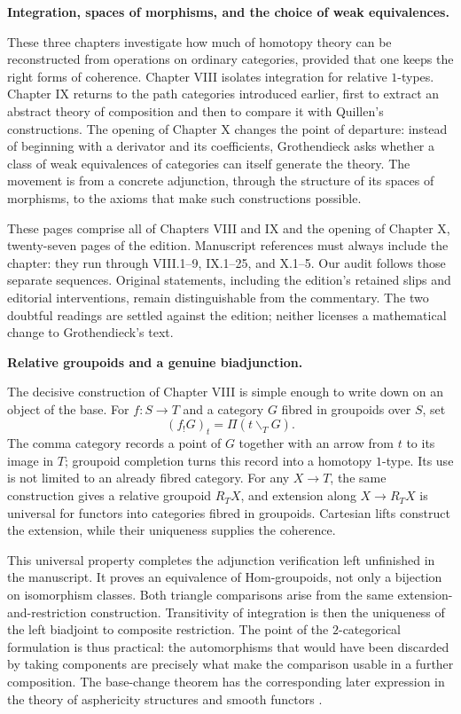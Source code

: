 \noindent\textbf{Integration, spaces of morphisms, and the choice of weak equivalences.}

These three chapters investigate how much of homotopy theory can be reconstructed from operations on ordinary categories, provided that one keeps the right forms of coherence. Chapter VIII isolates integration for relative $1$-types. Chapter IX returns to the path categories introduced earlier, first to extract an abstract theory of composition and then to compare it with Quillen's constructions. The opening of Chapter X changes the point of departure: instead of beginning with a derivator and its coefficients, Grothendieck asks whether a class of weak equivalences of categories can itself generate the theory. The movement is from a concrete adjunction, through the structure of its spaces of morphisms, to the axioms that make such constructions possible.

These pages comprise all of Chapters VIII and IX and the opening of Chapter X, twenty-seven pages of the edition. Manuscript references must always include the chapter: they run through VIII.1--9, IX.1--25, and X.1--5. Our audit follows those separate sequences. Original statements, including the edition's retained slips and editorial interventions, remain distinguishable from the commentary. The two doubtful readings are settled against the edition; neither licenses a mathematical change to Grothendieck's text.

\medskip\noindent\textbf{Relative groupoids and a genuine biadjunction.}

The decisive construction of Chapter VIII is simple enough to write down on an object of the base. For $f:S\to T$ and a category $G$ fibred in groupoids over $S$, set
\[
 (f_!G)_t=\Pi(t\backslash_TG).
\]
The comma category records a point of $G$ together with an arrow from $t$ to its image in $T$; groupoid completion turns this record into a homotopy $1$-type. Its use is not limited to an already fibred category. For any $X\to T$, the same construction gives a relative groupoid $R_TX$, and extension along $X\to R_TX$ is universal for functors into categories fibred in groupoids. Cartesian lifts construct the extension, while their uniqueness supplies the coherence.

This universal property completes the adjunction verification left unfinished in the manuscript. It proves an equivalence of Hom-groupoids, not only a bijection on isomorphism classes. Both triangle comparisons arise from the same extension-and-restriction construction. Transitivity of integration is then the uniqueness of the left biadjoint to composite restriction. The point of the $2$-categorical formulation is thus practical: the automorphisms that would have been discarded by taking components are precisely what make the comparison usable in a further composition. The base-change theorem has the corresponding later expression in the theory of asphericity structures and smooth functors \citep[\S5]{Maltsiniotis2005Asphericite}.

